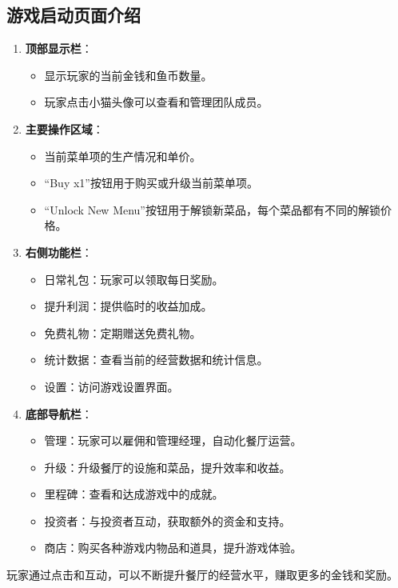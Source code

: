 \documentclass{mancls}%
\begin{document}
\subsection{游戏启动页面介绍}

\begin{enumerate}
  \item \textbf{顶部显示栏}：
        \begin{itemize}
          \item 显示玩家的当前金钱和鱼币数量。
          \item 玩家点击小猫头像可以查看和管理团队成员。
        \end{itemize}
  \item \textbf{主要操作区域}：
        \begin{itemize}
          \item 当前菜单项的生产情况和单价。
          \item “Buy x1”按钮用于购买或升级当前菜单项。
          \item “Unlock New Menu”按钮用于解锁新菜品，每个菜品都有不同的解锁价格。
        \end{itemize}
  \item \textbf{右侧功能栏}：
        \begin{itemize}
          \item 日常礼包：玩家可以领取每日奖励。
          \item 提升利润：提供临时的收益加成。
          \item 免费礼物：定期赠送免费礼物。
          \item 统计数据：查看当前的经营数据和统计信息。
          \item 设置：访问游戏设置界面。
        \end{itemize}
  \item \textbf{底部导航栏}：
        \begin{itemize}
          \item 管理：玩家可以雇佣和管理经理，自动化餐厅运营。
          \item 升级：升级餐厅的设施和菜品，提升效率和收益。
          \item 里程碑：查看和达成游戏中的成就。
          \item 投资者：与投资者互动，获取额外的资金和支持。
          \item 商店：购买各种游戏内物品和道具，提升游戏体验。
        \end{itemize}
\end{enumerate}

玩家通过点击和互动，可以不断提升餐厅的经营水平，赚取更多的金钱和奖励。
\end{document}
